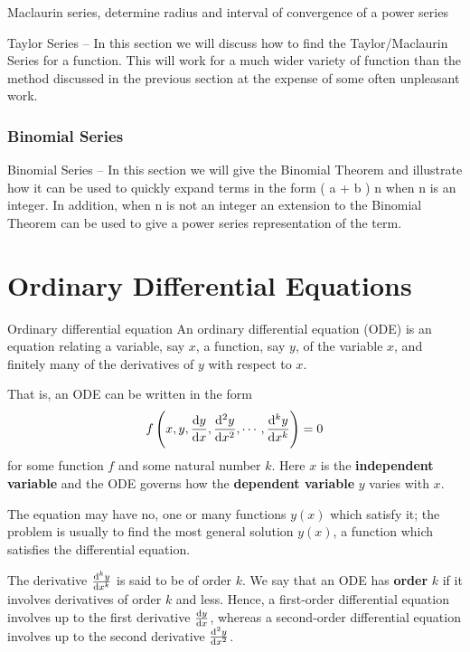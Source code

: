 Maclaurin series,  determine radius and interval
of convergence of a power series


Taylor Series – In this section we will discuss how to find the Taylor/Maclaurin Series for a function. This will work for a much wider variety of function than the method discussed in the previous section at the expense of some often unpleasant work.

\subsubsection{Binomial Series}
Binomial Series – In this section we will give the Binomial Theorem and illustrate how it can be used to quickly expand terms in the form 
(
a
+
b
)
n
 when 
n
 is an integer. In addition, when 
n
 is not an integer an extension to the Binomial Theorem can be used to give a power series representation of the term.

\section{Ordinary Differential Equations}

\begin{defn}{Ordinary differential equation}{} 
An ordinary differential equation (ODE) is an equation relating a variable, say $x$, a function, say $y$, of the variable $x$, and finitely many of the derivatives of $y$ with respect to $x$.

That is, an ODE can be written in the form
\[ f\left(x,y,\dv{y}{x},\dv[2]{y}{x},\cdots,\dv[k]{y}{x}\right) = 0 \]
for some function $f$ and some natural number $k$. Here $x$ is the \textbf{independent variable} and the ODE governs how the \textbf{dependent variable} $y$ varies with $x$. 
\end{defn}

\begin{remark}
The equation may have no, one or many functions $y(x)$ which satisfy it; the problem is usually to find the most general solution $y(x)$, a function which satisfies the differential equation.
\end{remark}

The derivative $\dv[k]{y}{x}$ is said to be of order $k$. We say that an ODE has \textbf{order} $k$ if it involves derivatives of order $k$ and less. Hence, a first-order differential equation involves up to the first derivative $\dv{y}{x}$, whereas a second-order differential equation involves up to the second derivative $\dv[2]{y}{x}$.

